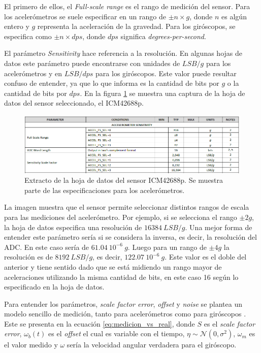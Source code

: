 El primero de ellos, el \textit{Full-scale range} es el rango de medición del sensor. Para los acelerómetros se suele especificar en un rango de $\pm n \times g$, donde $n$ es algún entero y $g$ representa la aceleración de la gravedad. Para los giróscopos, se especifica como $\pm n \times dps$, donde $dps$ significa \textit{degrees-per-second}.

El parámetro \textit{Sensitivity} hace referencia a la resolución. En algunas hojas de datos este parámetro puede encontrarse con unidades de $LSB/g$ para los acelerómetros y en $LSB/dps$ para los giróscopos. Este valor puede resultar confuso de entender, ya que lo que informa es la cantidad de bits por $g$ o la cantidad de bits por $dps$. En la figura \ref{fig:ICM_42688_datasheet} se muestra una captura de la hoja de datos del sensor seleccionado, el ICM42688p. 

\begin{figure}[H]
    \centering
    \includegraphics[width=\textwidth]{img/ICM_42688_datasheet.png}
    \caption{Extracto de la hoja de datos del sensor ICM42688p. Se muestra parte de las especificaciones para los acelerómetros.}
    \label{fig:ICM_42688_datasheet}    
\end{figure}

La imagen muestra que el sensor permite seleccionar distintos rangos de escala para las mediciones del acelerómetro. Por ejemplo, si se selecciona el rango $\pm 2g$, la hoja de datos especifica una resolución de $16384 \ LSB/g$. Una mejor forma de entender este parámetro sería si se considera la inversa, es decir, la resolución del ADC. En este caso sería de $61.04 \ 10^{-6} \ g$. Luego para un rango de $\pm 4g$ la resolución es de $8192 \ LSB/g$, es decir, $122.07 \ 10^{-6} \ g$. Este valor es el doble del anterior y tiene sentido dado que se está midiendo un rango mayor de aceleraciones utilizando la misma cantidad de bits, en este caso 16 según lo especificado en la hoja de datos.

Para entender los parámetros, \textit{scale factor error}, \textit{offset} y \textit{noise} se plantea un modelo sencillo de medición, tanto para acelerómetros como para giróscopos \cite{borodacz2022review}. Este se presenta en la ecuación \eqref{eq:medicion_vs_real}, donde $S$ es el \textit{scale factor error}, $\omega_b(t)$ es el \textit{offset} el cual es variable con el tiempo, $\eta \sim \mathcal{N}(0,\sigma^2)$, $\omega_m$ es el valor medido y $\omega$ sería la velocidad angular verdadera para el giróscopo.

